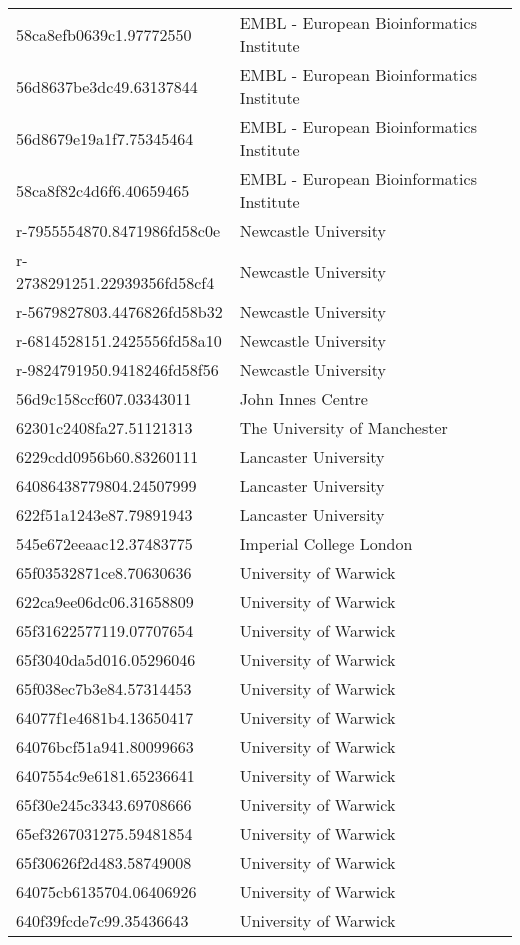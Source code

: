 \begin{tabular}{ll}
58ca8efb0639c1.97772550 & EMBL - European Bioinformatics Institute \\
56d8637be3dc49.63137844 & EMBL - European Bioinformatics Institute \\
56d8679e19a1f7.75345464 & EMBL - European Bioinformatics Institute \\
58ca8f82c4d6f6.40659465 & EMBL - European Bioinformatics Institute \\
r-7955554870.8471986fd58c0e & Newcastle University \\
r-2738291251.22939356fd58cf4 & Newcastle University \\
r-5679827803.4476826fd58b32 & Newcastle University \\
r-6814528151.2425556fd58a10 & Newcastle University \\
r-9824791950.9418246fd58f56 & Newcastle University \\
56d9c158ccf607.03343011 & John Innes Centre \\
62301c2408fa27.51121313 & The University of Manchester \\
6229cdd0956b60.83260111 & Lancaster University \\
64086438779804.24507999 & Lancaster University \\
622f51a1243e87.79891943 & Lancaster University \\
545e672eeaac12.37483775 & Imperial College London \\
65f03532871ce8.70630636 & University of Warwick \\
622ca9ee06dc06.31658809 & University of Warwick \\
65f31622577119.07707654 & University of Warwick \\
65f3040da5d016.05296046 & University of Warwick \\
65f038ec7b3e84.57314453 & University of Warwick \\
64077f1e4681b4.13650417 & University of Warwick \\
64076bcf51a941.80099663 & University of Warwick \\
6407554c9e6181.65236641 & University of Warwick \\
65f30e245c3343.69708666 & University of Warwick \\
65ef3267031275.59481854 & University of Warwick \\
65f30626f2d483.58749008 & University of Warwick \\
64075cb6135704.06406926 & University of Warwick \\
640f39fcde7c99.35436643 & University of Warwick \\

\end{tabular}
